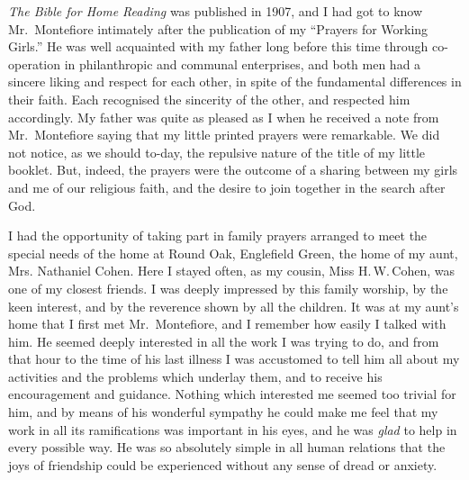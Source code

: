 \textsl{The Bible for Home Reading} was published in 1907,
and I had got to know Mr.\ Montefiore intimately after
the publication of my “Prayers for Working Girls.”
He was well acquainted with my father long before this
time through co-operation in philanthropic and communal
enterprises, and both men had a sincere liking and
respect for each other, in spite of the fundamental
differences in their faith. Each recognised the sincerity
of the other, and respected him accordingly. My
father was quite as pleased as I when he received a
note from Mr.\ Montefiore saying that my little printed
prayers were remarkable. We did not notice, as we
should to-day, the repulsive nature of the title of my
little booklet. But, indeed, the prayers were the
outcome of a sharing between my girls and me of our
religious faith, and the desire to join together in the
search after God.

I had the opportunity of taking part in family
prayers arranged to meet the special needs of the home
at Round Oak, Englefield Green, the home of my aunt,
Mrs. Nathaniel Cohen. Here I stayed often, as my
cousin, Miss H.\,W.\,Cohen, was one of my closest friends.
I was deeply impressed by this family worship, by the
keen interest, and by the reverence shown by all the
children. It was at my aunt’s home that I first met
Mr.\ Montefiore, and I remember how easily I talked with
him. He seemed deeply interested in all the work I was
trying to do, and from that hour to the time of his last
illness I was accustomed to tell him all about my
activities and the problems which underlay them, and
to receive his encouragement and guidance. Nothing
which interested me seemed too trivial for him, and by
means of his wonderful sympathy he could make me feel
that my work in all its ramifications was important in
his eyes, and he was \textsl{glad} to help in every possible way.
He was so absolutely simple in all human relations that
the joys of friendship could be experienced without any
sense of dread or anxiety.

